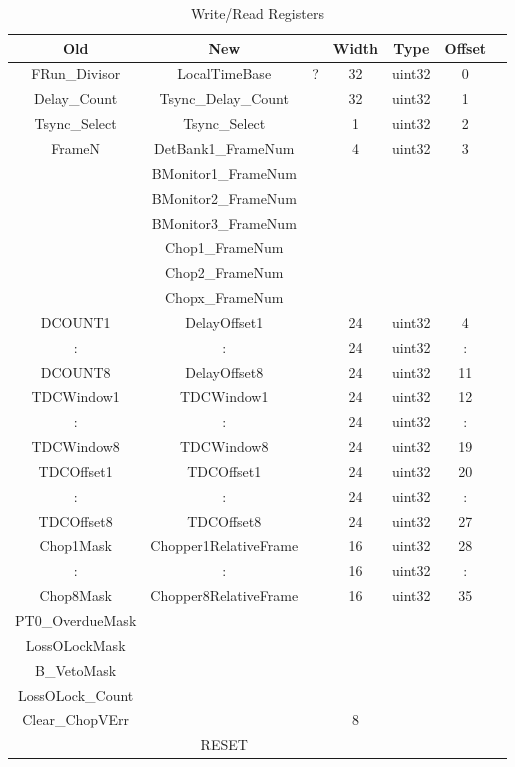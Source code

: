 \begin{table}[h]
  \begin{center}
    \begin{tabular}{c | c | c | c | c | c | c}
    Old & New & & Width & Type & Offset & \\
    \hline
    FRun\_Divisor & LocalTimeBase & ? & 32 & uint32 & 0 & \\
    Delay\_Count & Tsync\_Delay\_Count & & 32 & uint32 & 1 & \\
    Tsync\_Select & Tsync\_Select & & 1 & uint32 & 2 & \\
    FrameN & DetBank1\_FrameNum & & 4 & uint32 & 3 & \\
    & BMonitor1\_FrameNum & & & & & \\
    & BMonitor2\_FrameNum & & & & & \\
    & BMonitor3\_FrameNum & & & & & \\
    & Chop1\_FrameNum & & & & & \\
    & Chop2\_FrameNum & & & & & \\
    & Chopx\_FrameNum & & & & & \\
    DCOUNT1 & DelayOffset1 & & 24 & uint32 & 4 &\\
    : & : & & 24 & uint32 & : & \\
    DCOUNT8 & DelayOffset8 & & 24 & uint32 & 11 &\\
    TDCWindow1 & TDCWindow1 & & 24 & uint32 & 12 &\\
    : & : & & 24 & uint32 & : & \\
    TDCWindow8 & TDCWindow8 & & 24 & uint32 & 19 &\\
    TDCOffset1 & TDCOffset1 & & 24 & uint32 & 20 &\\
    : & : & & 24 & uint32 & : & \\
    TDCOffset8 & TDCOffset8 & & 24 & uint32 & 27 &\\
    Chop1Mask & Chopper1RelativeFrame & & 16 & uint32 & 28 & \\
    : & : & & 16 & uint32 & : &\\
    Chop8Mask & Chopper8RelativeFrame & & 16 & uint32 & 35 & \\
    PT0\_OverdueMask & & & & & &\\
    LossOLockMask & & & & & & \\
    B\_VetoMask & & & & & & \\
    LossOLock\_Count & & & & & & \\
    Clear\_ChopVErr & & & 8 & & &\\
    & RESET & & & & & \\
    \end{tabular}
  \end{center}
  \caption {Write/Read Registers}
  \label{table:Write_Read_Registers}
\end{table}

